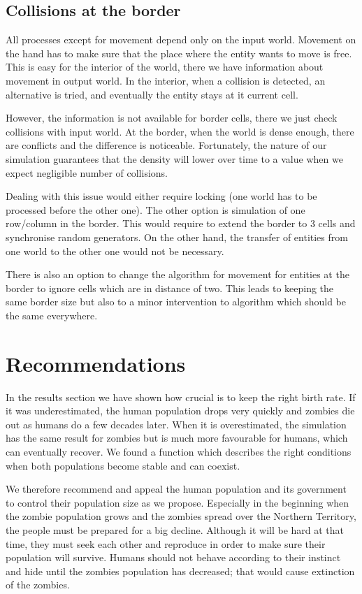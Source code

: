 \documentclass[a4paper]{article}
\begin{document}
\subsection{Collisions at the border}

All processes except for movement depend only on the input world.
Movement on the hand has to make sure that the place where the entity wants to move is free.
This is easy for the interior of the world, there we have information about movement in output world.
In the interior, when a collision is detected, an alternative is tried, and eventually the entity stays at it current cell.

However, the information is not available for border cells, there we just check collisions with input world.
At the border, when the world is dense enough, there are conflicts and the difference is noticeable.
Fortunately, the nature of our simulation guarantees that the density will lower over time to a value when we expect negligible number of collisions.

Dealing with this issue would either require locking (one world has to be processed before the other one).
The other option is simulation of one row/column in the border.
This would require to extend the border to 3 cells and synchronise random generators.
On the other hand, the transfer of entities from one world to the other one would not be necessary.

There is also an option to change the algorithm for movement for entities at the border to ignore cells which are in distance of two.
This leads to keeping the same border size but also to a minor intervention to algorithm which should be the same everywhere.

\section{Recommendations}

In the results section we have shown how crucial is to keep the right birth rate.
If it was underestimated, the human population drops very quickly and zombies die out as humans do a few decades later.
When it is overestimated, the simulation has the same result for zombies but is much more favourable for humans, which can eventually recover.
We found a function which describes the right conditions when both populations become stable and can coexist.

We therefore recommend and appeal the human population and its government to control their population size as we propose.
Especially in the beginning when the zombie population grows and the zombies spread over the Northern Territory, the people must be prepared for a big decline.
Although it will be hard at that time, they must seek each other and reproduce in order to make sure their population will survive.
Humans should not behave according to their instinct and hide until the zombies population has decreased; that would cause extinction of the zombies.



\begingroup
\raggedright



\endgroup
\end{document}
